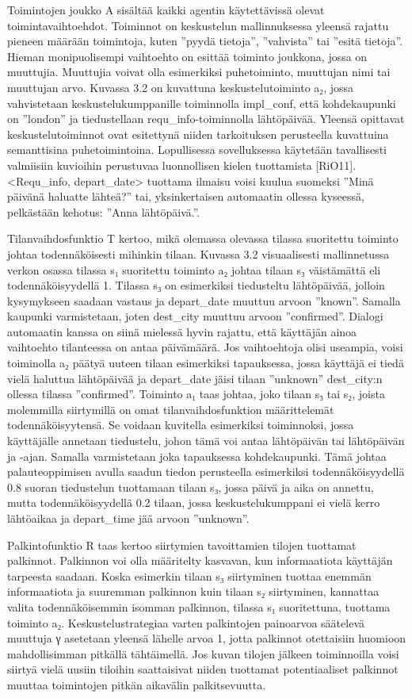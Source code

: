 \documentclass[finnish]{tktltiki2}
\theoremstyle{definition}
\theoremstyle{remark}
\begin{document}
Toimintojen joukko A sisältää kaikki agentin käytettävissä olevat toimintavaihtoehdot. Toiminnot on keskustelun mallinnuksessa yleensä rajattu pieneen määrään toimintoja, kuten ”pyydä tietoja”, ”vahvista” tai ”esitä tietoja”. Hieman monipuolisempi vaihtoehto on esittää toiminto joukkona, jossa on muuttujia. Muuttujia voivat olla esimerkiksi puhetoiminto, muuttujan nimi tai muuttujan arvo. Kuvassa 3.2 on kuvattuna keskustelutoiminto a₂, jossa vahvistetaan keskustelukumppanille toiminnolla impl_conf, että kohdekaupunki on ”london” ja tiedustellaan requ_info-toiminnolla lähtöpäivää. Yleensä opittavat keskustelutoiminnot ovat esitettynä niiden tarkoituksen perusteella kuvattuina semanttisina puhetoimintoina. Lopullisessa sovelluksessa käytetään tavallisesti valmiisiin kuvioihin perustuvaa luonnollisen kielen tuottamista [RiO11]. <Requ_info, depart_date> tuottama ilmaisu voisi kuulua suomeksi ”Minä päivänä haluatte lähteä?” tai, yksinkertaisen automaatin ollessa kyseessä, pelkästään kehotus: ”Anna lähtöpäivä.”. 
 
Tilanvaihdosfunktio T kertoo, mikä olemassa olevassa tilassa suoritettu toiminto johtaa todennäköisesti mihinkin tilaan. Kuvassa 3.2 visuaalisesti mallinnetussa verkon osassa tilassa s₁ suoritettu toiminto a₂ johtaa tilaan s₃ väistämättä eli todennäköisyydellä 1. Tilassa s₃ on esimerkiksi tiedusteltu lähtöpäivää, jolloin kysymykseen saadaan vastaus ja depart_date muuttuu arvoon ”known”. Samalla kaupunki varmistetaan, joten dest_city muuttuu arvoon ”confirmed”. Dialogi automaatin kanssa on siinä mielessä hyvin rajattu, että käyttäjän ainoa vaihtoehto tilanteessa on antaa päivämäärä. Jos vaihtoehtoja olisi useampia, voisi toiminolla a₂ päätyä uuteen tilaan esimerkiksi tapauksessa, jossa käyttäjä ei tiedä vielä haluttua lähtöpäivää ja depart_date jäisi tilaan ”unknown” dest_city:n ollessa tilassa ”confirmed”. Toiminto a₁ taas johtaa, joko tilaan s₃ tai s₂, joista molemmilla siirtymillä on omat tilanvaihdosfunktion määrittelemät todennäköisyytensä. Se voidaan kuvitella esimerkiksi toiminnoksi, jossa käyttäjälle annetaan tiedustelu, johon tämä voi antaa lähtöpäivän tai lähtöpäivän ja -ajan. Samalla varmistetaan joka tapauksessa kohdekaupunki. Tämä johtaa palauteoppimisen avulla saadun tiedon perusteella esimerkiksi todennäköisyydellä 0.8 suoran tiedustelun tuottamaan tilaan s₃, jossa päivä ja aika on annettu, mutta todennäköisyydellä 0.2 tilaan, jossa keskustelukumppani ei vielä kerro lähtöaikaa ja depart_time jää arvoon ”unknown”. 
 
Palkintofunktio R taas kertoo siirtymien tavoittamien tilojen tuottamat palkinnot. Palkinnon voi olla määritelty kasvavan, kun informaatiota käyttäjän tarpeesta saadaan. Koska esimerkin tilaan s₃ siirtyminen tuottaa enemmän informaatiota ja suuremman palkinnon kuin tilaan s₂ siirtyminen, kannattaa valita todennäköisemmin isomman palkinnon, tilassa s₁ suoritettuna, tuottama toiminto a₂. Keskustelustrategiaa varten palkintojen painoarvoa säätelevä muuttuja γ asetetaan yleensä lähelle arvoa 1, jotta palkinnot otettaisiin huomioon mahdollisimman pitkällä tähtäimellä. Jos kuvan tilojen jälkeen toiminnoilla voisi siirtyä vielä uusiin tiloihin saattaisivat niiden tuottamat potentiaaliset palkinnot muuttaa toimintojen pitkän aikavälin palkitsevuutta. 
 
\end{document}
